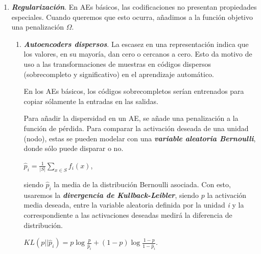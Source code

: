 \begin{enumerate}
\begin{enumerate}
\begin{enumerate}
        \end{enumerate}
        
        \item \textit{\textbf{Regularización}}. En AEs básicos, las codificaciones no presentan propiedades especiales. Cuando queremos que esto ocurra, añadimos a la función objetivo una penalización $\Omega$.
            
            
            \begin{enumerate}
                \item \textit{\textbf{Autoencoders dispersos}}. La escasez en una representación indica que los valores, en su mayoría, dan cero o cercanos a cero. Esto da motivo de uso a las transformaciones de muestras en códigos dispersos (sobrecompleto y significativo) en el aprendizaje automático. 
                
                En los AEs básicos, los códigos sobrecompletos serían entrenados para copiar sólamente la entradas en las salidas.
                
                Para añadir la dispersidad en un AE, se añade una penalización a la función de pérdida. Para comparar la activación deseada de una unidad (nodo), estas se pueden modelar con una  \textit{\textbf{variable aleatoria Bernoulli}}, donde sólo puede disparar o no.
                
                \begin{center}
                $\hat{p}_{i} = \frac{1}{|S|} \sum_{x \in S} f_{i}(x)$,
                \end{center}
                
                siendo $\hat{p}_{i}$ la media de la distribución Bernoulli asociada. Con esto, usaremos la \textit{\textbf{divergencia de Kullback-Leibler}}, siendo $p$ la activación media deseada, entre la variable aleatoria definida por la unidad \textit{i} y la correspondiente a las activaciones deseadas medirá la diferencia de distribución.
                
                \begin{center}
                $KL(p||\hat{p}_{i}) = p \log\frac{p}{\hat{p}_{i}} + (1 - p) \log\frac{1 - p}{1 - \hat{p}_{i}}$.
                \end{center}
                \newpage
                

\end{enumerate}
\end{enumerate}
\end{enumerate}
